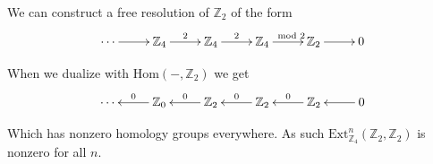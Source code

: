 \documentclass[10pt]{article}
\newcommand{\bb}[1]{\mathbb{#1}}
\newcommand{\Ext}{\mathrm{Ext}}
\newcommand{\Hom}{\mathrm{Hom}}
\theoremstyle{plain}
\theoremstyle{remark}
\begin{document}
We can construct a free resolution of $\bb{Z}_2$ of the form
\[
  \xymatrix{
    \cdots \ar[r] & \bb{Z}_4 \ar[r]^2 & \bb{Z}_4 \ar[r]^2 & \bb{Z}_4 \ar[r]^-{\mod 2} & \bb{Z}_2 \ar[r] & 0
  }
\]

When we dualize with $\Hom(-,\bb{Z}_2)$ we get
\[
  \xymatrix{
    \cdots & \bb{Z}_0 \ar[l]_0 & \bb{Z}_2 \ar[l]_0 & \bb{Z}_2 \ar[l]_0 & \bb{Z}_2 \ar[l]_0 & \ar[l] 0
  }
\]

Which has nonzero homology groups everywhere. As such $\Ext_{\bb{Z}_4}^n(\bb{Z}_2,\bb{Z}_2)$
is nonzero for all $n$.

\end{document}

